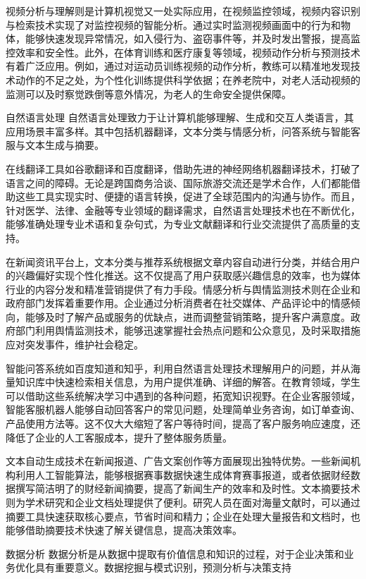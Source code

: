 视频分析与理解则是计算机视觉又一处实际应用，在视频监控领域，视频内容识别与检索技术实现了对监控视频的智能分析。通过实时监测视频画面中的行为和物体，能够快速发现异常情况，如入侵行为、盗窃事件等，并及时发出警报，提高监控效率和安全性。此外，在体育训练和医疗康复等领域，视频动作分析与预测技术有着广泛应用。例如，通过对运动员训练视频的动作分析，教练可以精准地发现技术动作的不足之处，为个性化训练提供科学依据；在养老院中，对老人活动视频的监测可以及时察觉跌倒等意外情况，为老人的生命安全提供保障。


自然语言处理
自然语言处理致力于让计算机能够理解、生成和交互人类语言，其应用场景丰富多样。其中包括机器翻译，文本分类与情感分析，问答系统与智能客服与文本生成与摘要。


在线翻译工具如谷歌翻译和百度翻译，借助先进的神经网络机器翻译技术，打破了语言之间的障碍。无论是跨国商务洽谈、国际旅游交流还是学术合作，人们都能借助这些工具实现实时、便捷的语言转换，促进了全球范围内的沟通与协作。而且，针对医学、法律、金融等专业领域的翻译需求，自然语言处理技术也在不断优化，能够准确处理专业术语和复杂句式，为专业文献翻译和行业交流提供了高质量的支持。


在新闻资讯平台上，文本分类与推荐系统根据文章内容自动进行分类，并结合用户的兴趣偏好实现个性化推送。这不仅提高了用户获取感兴趣信息的效率，也为媒体行业的内容分发和精准营销提供了有力手段。情感分析与舆情监测技术则在企业和政府部门发挥着重要作用。企业通过分析消费者在社交媒体、产品评论中的情感倾向，能够及时了解产品或服务的优缺点，进而调整营销策略，提升客户满意度。政府部门利用舆情监测技术，能够迅速掌握社会热点问题和公众意见，及时采取措施应对突发事件，维护社会稳定。


智能问答系统如百度知道和知乎，利用自然语言处理技术理解用户的问题，并从海量知识库中快速检索相关信息，为用户提供准确、详细的解答。在教育领域，学生可以借助这些系统解决学习中遇到的各种问题，拓宽知识视野。在企业客服领域，智能客服机器人能够自动回答客户的常见问题，处理简单业务咨询，如订单查询、产品使用方法等。这不仅大大缩短了客户等待时间，提高了客户服务响应速度，还降低了企业的人工客服成本，提升了整体服务质量。


文本自动生成技术在新闻报道、广告文案创作等方面展现出独特优势。一些新闻机构利用人工智能算法，能够根据赛事数据快速生成体育赛事报道，或者依据财经数据撰写简洁明了的财经新闻摘要，提高了新闻生产的效率和及时性。文本摘要技术则为学术研究和企业文档处理提供了便利。研究人员在面对海量文献时，可以通过摘要工具快速获取核心要点，节省时间和精力；企业在处理大量报告和文档时，也能够借助摘要技术快速了解关键信息，提高决策效率。


数据分析
数据分析是从数据中提取有价值信息和知识的过程，对于企业决策和业务优化具有重要意义。数据挖掘与模式识别，预测分析与决策支持



